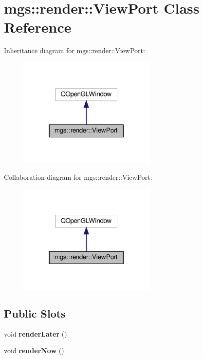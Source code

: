 \hypertarget{classmgs_1_1render_1_1ViewPort}{}\section{mgs\+:\+:render\+:\+:View\+Port Class Reference}
\label{classmgs_1_1render_1_1ViewPort}


Inheritance diagram for mgs\+:\+:render\+:\+:View\+Port\+:
\nopagebreak
\begin{figure}[H]
\begin{center}
\leavevmode
\includegraphics[width=194pt]{classmgs_1_1render_1_1ViewPort__inherit__graph}
\end{center}
\end{figure}


Collaboration diagram for mgs\+:\+:render\+:\+:View\+Port\+:
\nopagebreak
\begin{figure}[H]
\begin{center}
\leavevmode
\includegraphics[width=194pt]{classmgs_1_1render_1_1ViewPort__coll__graph}
\end{center}
\end{figure}
\subsection*{Public Slots}
\begin{DoxyCompactItemize}
\item 
\mbox{\label{classmgs_1_1render_1_1ViewPort_a477ad01f97f1fb3f4886d00cfbdb8ef6}} 
void {\bfseries render\+Later} ()
\item 
\mbox{\label{classmgs_1_1render_1_1ViewPort_a51212e627debda9cf900227f975bd8d9}} 
void {\bfseries render\+Now} ()
\end{DoxyCompactItemize}
